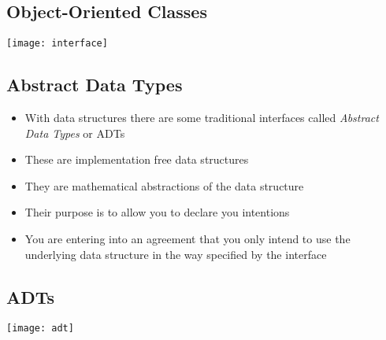 
\begin{slide}
\section{Object-Oriented Classes}

\begin{center}
  \texttt{[image: interface]}
\end{center}

\end{slide}



\begin{slide}
\section{Abstract Data Types}

\begin{PauseHighLight}
  \begin{itemize}
  \item With data structures there are some traditional interfaces
    called \emph{Abstract Data Types} or ADTs\pause
  \item These are implementation free data structures\pause
  \item They are mathematical abstractions of the data structure\pause
  \item Their purpose is to allow you to declare you intentions\pause
  \item You are entering into an agreement that you only intend to use
    the underlying data structure in the way specified by the
    interface\pause
  \end{itemize}
\end{PauseHighLight}
\end{slide}


\begin{slide}
\section{ADTs}

\begin{center}
  \texttt{[image: adt]}
\end{center}
\end{slide}


